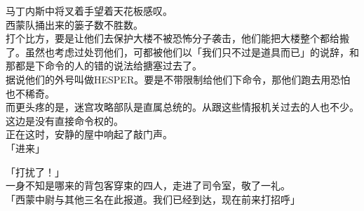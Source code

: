 马丁内斯中将叉着手望着天花板感叹。\\

西蒙队捅出来的篓子数不胜数。\\

打个比方，要是让他们去保护大楼不被恐怖分子袭击，他们能把大楼整个都给搬了。虽然也考虑过处罚他们，可都被他们以「我们只不过是道具而已」的说辞，和那都是下命令的人的错的说法给搪塞过去了。\\

据说他们的外号叫做HESPER。要是不带限制给他们下命令，那他们跑去用恐怕也不稀奇。\\

而更头疼的是，迷宫攻略部队是直属总统的。从跟这些情报机关过去的人也不少。这边是没有直接命令权的。\\

正在这时，安静的屋中响起了敲门声。\\

「进来」

「打扰了！」\\

一身不知是哪来的背包客穿束的四人，走进了司令室，敬了一礼。\\

「西蒙中尉与其他三名在此报道。我们已经到达，现在前来打招呼」

